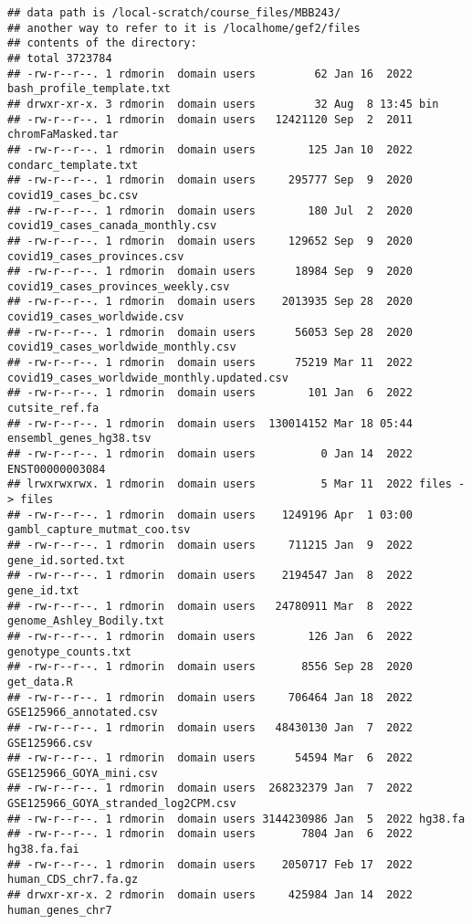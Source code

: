 \documentclass[
]{article}
\begin{document}
\begin{verbatim}
## data path is /local-scratch/course_files/MBB243/
## another way to refer to it is /localhome/gef2/files
## contents of the directory:
## total 3723784
## -rw-r--r--. 1 rdmorin  domain users         62 Jan 16  2022 bash_profile_template.txt
## drwxr-xr-x. 3 rdmorin  domain users         32 Aug  8 13:45 bin
## -rw-r--r--. 1 rdmorin  domain users   12421120 Sep  2  2011 chromFaMasked.tar
## -rw-r--r--. 1 rdmorin  domain users        125 Jan 10  2022 condarc_template.txt
## -rw-r--r--. 1 rdmorin  domain users     295777 Sep  9  2020 covid19_cases_bc.csv
## -rw-r--r--. 1 rdmorin  domain users        180 Jul  2  2020 covid19_cases_canada_monthly.csv
## -rw-r--r--. 1 rdmorin  domain users     129652 Sep  9  2020 covid19_cases_provinces.csv
## -rw-r--r--. 1 rdmorin  domain users      18984 Sep  9  2020 covid19_cases_provinces_weekly.csv
## -rw-r--r--. 1 rdmorin  domain users    2013935 Sep 28  2020 covid19_cases_worldwide.csv
## -rw-r--r--. 1 rdmorin  domain users      56053 Sep 28  2020 covid19_cases_worldwide_monthly.csv
## -rw-r--r--. 1 rdmorin  domain users      75219 Mar 11  2022 covid19_cases_worldwide_monthly.updated.csv
## -rw-r--r--. 1 rdmorin  domain users        101 Jan  6  2022 cutsite_ref.fa
## -rw-r--r--. 1 rdmorin  domain users  130014152 Mar 18 05:44 ensembl_genes_hg38.tsv
## -rw-r--r--. 1 rdmorin  domain users          0 Jan 14  2022 ENST00000003084
## lrwxrwxrwx. 1 rdmorin  domain users          5 Mar 11  2022 files -> files
## -rw-r--r--. 1 rdmorin  domain users    1249196 Apr  1 03:00 gambl_capture_mutmat_coo.tsv
## -rw-r--r--. 1 rdmorin  domain users     711215 Jan  9  2022 gene_id.sorted.txt
## -rw-r--r--. 1 rdmorin  domain users    2194547 Jan  8  2022 gene_id.txt
## -rw-r--r--. 1 rdmorin  domain users   24780911 Mar  8  2022 genome_Ashley_Bodily.txt
## -rw-r--r--. 1 rdmorin  domain users        126 Jan  6  2022 genotype_counts.txt
## -rw-r--r--. 1 rdmorin  domain users       8556 Sep 28  2020 get_data.R
## -rw-r--r--. 1 rdmorin  domain users     706464 Jan 18  2022 GSE125966_annotated.csv
## -rw-r--r--. 1 rdmorin  domain users   48430130 Jan  7  2022 GSE125966.csv
## -rw-r--r--. 1 rdmorin  domain users      54594 Mar  6  2022 GSE125966_GOYA_mini.csv
## -rw-r--r--. 1 rdmorin  domain users  268232379 Jan  7  2022 GSE125966_GOYA_stranded_log2CPM.csv
## -rw-r--r--. 1 rdmorin  domain users 3144230986 Jan  5  2022 hg38.fa
## -rw-r--r--. 1 rdmorin  domain users       7804 Jan  6  2022 hg38.fa.fai
## -rw-r--r--. 1 rdmorin  domain users    2050717 Feb 17  2022 human_CDS_chr7.fa.gz
## drwxr-xr-x. 2 rdmorin  domain users     425984 Jan 14  2022 human_genes_chr7

\end{verbatim}
\end{document}
